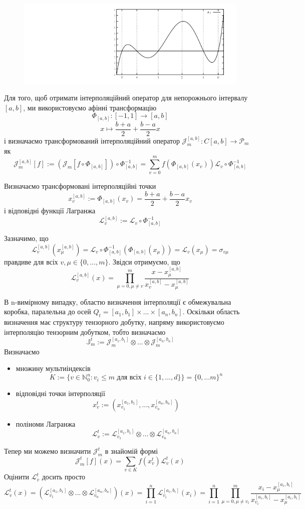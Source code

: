 \documentclass[12pt]{report}
\begin{document}
		\begin{figure}[h]{
				\includegraphics{2_1}
			}
		\end{figure}
	\par Для того, щоб отримати інтерполяційний оператор для непорожнього інтервалу $[a,b]$, ми використовуємо афінні трансформацію
	$$\Phi_{[a,b]}:[-1,1]\rightarrow [a,b]$$
	$$x\mapsto \frac{b+a}{2}+\frac{b-a}{2}x$$
	і визначаємо трансформований інтерполяційний оператор $\mathcal{J}_m^{[a,b]}:C[a,b]\rightarrow\mathcal{P}_m$ як
	$$\mathcal{J}_m^{[a,b]}[f] := (\mathcal{J}_m[f\circ\Phi_{[a,b]}])\circ \Phi_{[a,b]}^{-1}=\sum_{v=0}^{m}f(\Phi_{[a,b]}(x_v))\mathcal{L}_v\circ\Phi_{[a,b]}^{-1}$$
	\par Визначаємо трансформовані інтерполяційні точки
	$$x_v^{[a,b]}:=\Phi_{[a,b]}(x_v)=\frac{b+a}{2}+\frac{b-a}{2}x_v$$
	і відповідні функції Лагранжа
	$$\mathcal{L}_v^{[a,b]}:=\mathcal{L}_v\circ\Phi_{[a,b]}^{-1}$$
	\par Зазначимо, що
	$$\mathcal{L}_v^{[a,b]}(x_\mu^{[a,b]})=\mathcal{L}_v\circ\Phi_{[a,b]}^{-1}(\Phi_{[a,b]}(x_\mu))=\mathcal{L}_v(x_\mu)=\sigma_{v\mu}$$
	правдиве для всіх $v,\mu\in\{0,...,m\}$. Звідси отримуємо, що
	$$\mathcal{L}_v^{[a,b]}(x)=\prod_{\mu=0,\mu\not=v}^{m}\frac{x-x_\mu^{[a,b]}}{x_v^{[a,b]}-x_\mu^{[a,b]}}$$
	\par В n-вимірному випадку, областю визначення інтерполяції є обмежувальна коробка, паралельна до осей $Q_t=[a_1,b_1]\times...\times[a_n,b_n]$. Оскільки область визначення має структуру тензорного добутку, напряму використовуємо інтерполяцію тензорним добутком, тобто визначаємо 
	$$\mathbb{J}_m^t:=\mathcal{J}_m^{[a_1,b_1]}\otimes...\otimes\mathcal{J}_m^{[a_n,b_n]}$$ 
	Визначаємо
	\begin{itemize}
		\item множину мультиіндексів
		$$K:=\{v\in\mathbb{N}_0^n:v_i\le m \mbox{ для всіх } i\in \{1,...,d\}\}=\{0,...m\}^n$$
		\item відповідні точки інтерполяції
		$$x_v^t:=(x_{v_1}^{[a_1,b_1]},...,x_{v_n}^{[a_n,b_n]})$$
		\item поліноми Лагранжа
		$$\mathcal{L}_v^t:=\mathcal{L}_{v_1}^{[a_1,b_1]}\otimes...\otimes\mathcal{L}_{v_n}^{[a_n,b_n]}$$
	\end{itemize}
	Тепер ми можемо визначити $\mathcal{J}_m^t$ в знайомій формі
	$$\mathcal{J}_m^t[f](x)=\sum_{v\in K}f(x_v^t)\mathcal{L}_v^t(x)$$
	Оцінити $\mathcal{L}_v^t$ досить просто
	$$\mathcal{L}_v^t(x)=\left(\mathcal{L}_{v_1}^{[a_1,b_1]}\otimes...\otimes\mathcal{L}_{v_n}^{[a_n,b_n]}\right)(x)=\prod_{i=1}^{n}\mathcal{L}_{v_i}^{[a_i,b_i]}(x_i)=\prod_{i=1}^{n}\prod_{\mu=0,\mu\not=v_i}^{m}\frac{x_i-x_\mu^{[a_i,b_i]}}{x_{v_i}^{[a_i,b_i]}-x_\mu^{[a_i,b_i]}}$$
\end{document}
